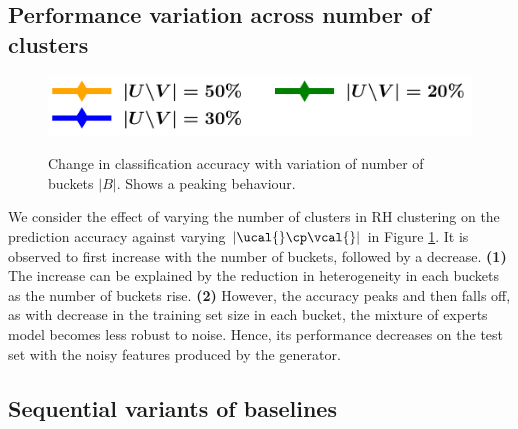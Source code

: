 \documentclass[letterpaper]{article}
\begin{document}
\subsection{Performance variation across number of clusters}
\begin{figure}[h]
    \centering
    \includegraphics[width=0.5\linewidth]{FIG/legend_var_clusters.pdf}\\[-1ex]
\vspace{-1mm}
        \caption{Change in classification accuracy with variation of number of buckets $|B|$. Shows a peaking behaviour.}
        \label{fig:clusters}
\end{figure}
We consider the effect of varying the number of clusters in RH clustering on the prediction accuracy 
against varying $|\ucal{} \cp \vcal{}|$ in Figure \ref{fig:clusters}. It is observed to first increase with the number of buckets, followed by a decrease. \textbf{(1)} The increase can be explained by the reduction in heterogeneity in each buckets as the number of buckets rise. \textbf{(2)}  However, the accuracy peaks and then falls off, as with decrease in the training set size in each bucket, the mixture of experts model becomes less robust to noise. Hence, its performance decreases on the test set with the noisy features produced by the generator.


 
\subsection{Sequential variants of baselines}
\end{document}

